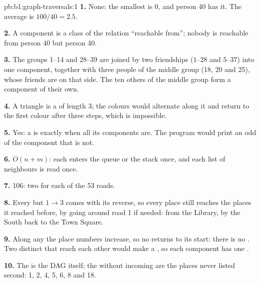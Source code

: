 \begin{solution}{pb:b1:graph-traversals:1}
\textbf{1.} None: the smallest  is 0, and person 40 has it. The average  is $100 / 40 = 2.5$.

\textbf{2.} A component is a class of the relation ``reachable from''; nobody is reachable from person 40 but
person 40.

\textbf{3.} The groups 1--14 and 28--39 are joined by two friendships ($1$--$28$ and $5$--$37$) into one component,
together with three people of the middle group (18, 20 and 25), whose friends are on that side. The ten others of the
middle group form a component of their own.

\textbf{4.} A triangle is a  of length 3; the colours would alternate along it and return to the first colour
after three steps, which is impossible.

\textbf{5.} Yes: a  is  exactly when all its components are. The program would print an odd  of the
component that is not.

\textbf{6.} $O(n + m)$: each  enters the queue or the stack once, and each list of neighbours is read once.

\textbf{7.} 106: two for each of the 53 roads.

\textbf{8.} Every  but $1 \to 3$ comes with its reverse, so every place still reaches the places it reached before,
by going around road 1 if needed: from the Library, by the South  back to the Town Square.

\textbf{9.} Along any  the place numbers increase, so no  returns to its start: there is no . Two
distinct  that reach each other would make a , so each component has one .

\textbf{10.} The  is the DAG itself; the  without incoming  are the places never listed
second: 1, 2, 4, 5, 6, 8 and 18.


\end{solution}

